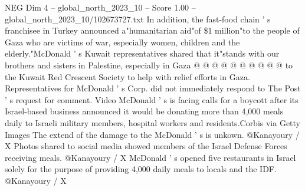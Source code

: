 \begin{textsample}{NEG Dim 4 – global\_north\_2023\_10 – Score 1.00 – global\_north\_2023\_10/102673727.txt}
In addition, the fast-food chain ' s franchisee in Turkey announced a"humanitarian aid"of \$1 million"to the people of Gaza who are victims of war, especially women, children and the elderly."McDonald ' s Kuwait representatives shared that it"stands with our brothers and sisters in Palestine, especially in Gaza @ @ @ @ @ @ @ @ @ @ to the Kuwait Red Crescent Society to help with relief efforts in Gaza.
Representatives for McDonald ' s Corp. did not immediately respond to The Post ' s request for comment.
Video McDonald ' s is facing calls for a boycott after its Israel-based business announced it would be donating more than 4,000 meals daily to Israeli military members, hospital workers and residents.Corbis via Getty Images The extend of the damage to the McDonald ' s is unkown. @Kanayoury / X Photos shared to social media showed members of the Israel Defense Forces receiving meals. @Kanayoury / X McDonald ' s opened five restaurants in Israel solely for the purpose of providing 4,000 daily meals to locals and the IDF. @Kanayoury / X

\end{textsample}
